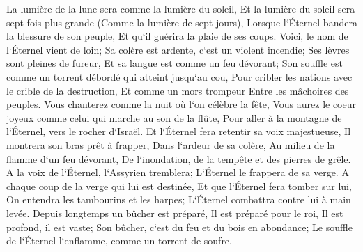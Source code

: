 \verse La lumière de la lune sera comme la lumière du soleil, Et la lumière du soleil sera sept fois plus grande (Comme la lumière de sept jours), Lorsque l`Éternel bandera la blessure de son peuple, Et qu`il guérira la plaie de ses coups. 
\verse Voici, le nom de l`Éternel vient de loin; Sa colère est ardente, c`est un violent incendie; Ses lèvres sont pleines de fureur, Et sa langue est comme un feu dévorant; 
\verse Son souffle est comme un torrent débordé qui atteint jusqu`au cou, Pour cribler les nations avec le crible de la destruction, Et comme un mors trompeur Entre les mâchoires des peuples. 
\verse Vous chanterez comme la nuit où l`on célèbre la fête, Vous aurez le coeur joyeux comme celui qui marche au son de la flûte, Pour aller à la montagne de l`Éternel, vers le rocher d`Israël. 
\verse Et l`Éternel fera retentir sa voix majestueuse, Il montrera son bras prêt à frapper, Dans l`ardeur de sa colère, Au milieu de la flamme d`un feu dévorant, De l`inondation, de la tempête et des pierres de grêle. 
\verse A la voix de l`Éternel, l`Assyrien tremblera; L`Éternel le frappera de sa verge. 
\verse A chaque coup de la verge qui lui est destinée, Et que l`Éternel fera tomber sur lui, On entendra les tambourins et les harpes; L`Éternel combattra contre lui à main levée. 
\verse Depuis longtemps un bûcher est préparé, Il est préparé pour le roi, Il est profond, il est vaste; Son bûcher, c`est du feu et du bois en abondance; Le souffle de l`Éternel l`enflamme, comme un torrent de soufre. 

